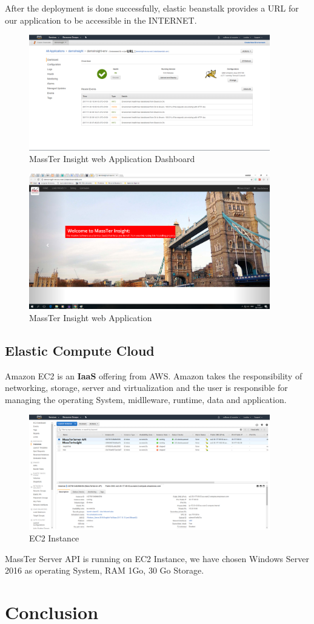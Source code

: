 After the deployment is done successfully, elastic beanstalk provides a URL for our application to be accessible in the INTERNET.
	 \begin{figure}[h]
	\centering
	\includegraphics[angle=90,width=10.5cm]{massTerInsightDashboard.png}
	\caption{MassTer Insight web Application Dashboard}	
\end{figure} 
	 \begin{figure}[h]
	\centering
	\includegraphics[angle=90,width=10.5cm]{massTerInsightWeb.png}
	\caption{MassTer Insight web Application}	
\end{figure} 
     \clearpage
	\newpage 
	\subsection{Elastic Compute Cloud}
	Amazon EC2 is an \textbf{IaaS} offering from AWS. Amazon takes the responsibility of networking, storage, server and virtualization and the user is responsible for managing the operating System, midlleware, runtime, data and application.
	
 \pagebreak
\clearpage
\newpage
	 \begin{figure}[h]
		\centering
		\includegraphics[angle=90,width=10.5cm]{ec2Instance.png}
		\caption{EC2 Instance}	
	\end{figure} 
 \pagebreak
\clearpage
\newpage
	MassTer Server API is running on EC2 Instance, we have chosen Windows Server 2016 as operating System, RAM 1Go, 30 Go Storage. 
	\clearpage
	\newpage
	\section{Conclusion}